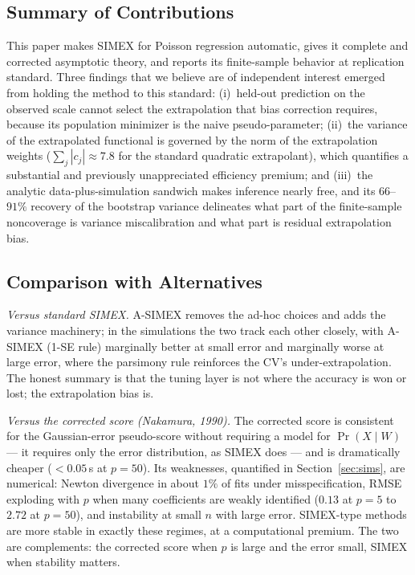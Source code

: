 \subsection{Summary of Contributions}

This paper makes SIMEX for Poisson regression automatic, gives it
complete and corrected asymptotic theory, and reports its
finite-sample behavior at replication standard. Three findings that we
believe are of independent interest emerged from holding the method to
this standard: (i)~held-out prediction on the observed scale cannot
select the extrapolation that bias correction requires, because its
population minimizer is the naive pseudo-parameter; (ii)~the variance
of the extrapolated functional is governed by the norm of the
extrapolation weights ($\sum_j|c_j|\approx7.8$ for the standard
quadratic extrapolant), which quantifies a substantial and previously
unappreciated efficiency premium; and (iii)~the analytic
data-plus-simulation sandwich makes inference nearly free, and its
$66$--$91\%$ recovery of the bootstrap variance delineates what part
of the finite-sample noncoverage is variance miscalibration and what
part is residual extrapolation bias.

\subsection{Comparison with Alternatives}

\emph{Versus standard SIMEX.} A-SIMEX removes the ad-hoc choices and
adds the variance machinery; in the simulations the two track each
other closely, with A-SIMEX (1-SE rule) marginally better at small
error and marginally worse at large error, where the parsimony rule
reinforces the CV's under-extrapolation. The honest summary is that
the tuning layer is not where the accuracy is won or lost; the
extrapolation bias is.

\emph{Versus the corrected score (Nakamura, 1990).} The corrected
score is consistent for the Gaussian-error pseudo-score without
requiring a model for $\Pr(X\mid W)$ --- it requires only the error
distribution, as SIMEX does --- and is dramatically cheaper
($<0.05$\,s at $p=50$). Its weaknesses, quantified in
Section~\ref{sec:sims}, are numerical: Newton divergence in about
$1\%$ of fits under misspecification, RMSE exploding with $p$ when
many coefficients are weakly identified ($0.13$ at $p=5$ to $2.72$ at
$p=50$), and instability at small $n$ with large error. SIMEX-type
methods are more stable in exactly these regimes, at a
computational premium. The two are complements: the corrected score
when $p$ is large and the error small, SIMEX when stability matters.

